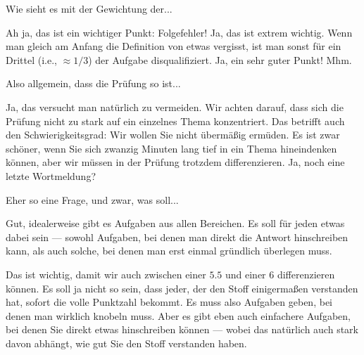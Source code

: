 \begin{student-interaction}[Studentenfrage]
Wie sieht es mit der Gewichtung der...
\end{student-interaction}

\begin{spoken-clean}[01:26:54 - 01:27:19]
Ah ja, das ist ein wichtiger Punkt: Folgefehler! Ja, das ist extrem wichtig. Wenn man gleich am Anfang die Definition von etwas vergisst, ist man sonst für ein Drittel (i.e., $\approx 1/3$) der Aufgabe disqualifiziert. Ja, ein sehr guter Punkt! Mhm.
\end{spoken-clean}

\begin{student-interaction}[Studentenfrage]
Also allgemein, dass die Prüfung so ist...
\end{student-interaction}

\begin{spoken-clean}[01:27:19 - 01:27:49]
Ja, das versucht man natürlich zu vermeiden. Wir achten darauf, dass sich die Prüfung nicht zu stark auf ein einzelnes Thema konzentriert. Das betrifft auch den Schwierigkeitsgrad: Wir wollen Sie nicht übermäßig ermüden. Es ist zwar schöner, wenn Sie sich zwanzig Minuten lang tief in ein Thema hineindenken können, aber wir müssen in der Prüfung trotzdem differenzieren. Ja, noch eine letzte Wortmeldung?
\end{spoken-clean}

\begin{student-interaction}[Studentenfrage]
Eher so eine Frage, und zwar, was soll...
\end{student-interaction}

\begin{spoken-clean}[01:27:49 - 01:28:29]
Gut, idealerweise gibt es Aufgaben aus allen Bereichen. Es soll für jeden etwas dabei sein --- sowohl Aufgaben, bei denen man direkt die Antwort hinschreiben kann, als auch solche, bei denen man erst einmal gründlich überlegen muss.

Das ist wichtig, damit wir auch zwischen einer $5.5$ und einer $6$ differenzieren können. Es soll ja nicht so sein, dass jeder, der den Stoff einigermaßen verstanden hat, sofort die volle Punktzahl bekommt. Es muss also Aufgaben geben, bei denen man wirklich knobeln muss. Aber es gibt eben auch einfachere Aufgaben, bei denen Sie direkt etwas hinschreiben können --- wobei das natürlich auch stark davon abhängt, wie gut Sie den Stoff verstanden haben.
\end{spoken-clean}

